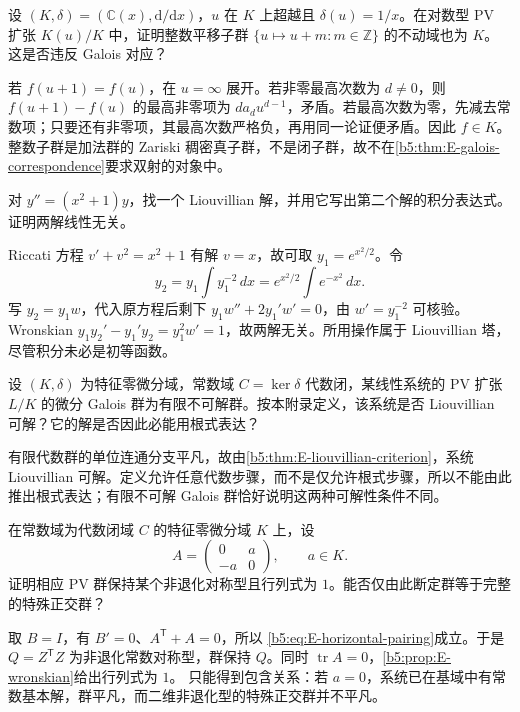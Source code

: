\begin{exercise}
	设 \((K,\delta)=(\mathbb C(x),\mathrm d/\mathrm dx)\)，\(u\) 在 \(K\) 上超越且 \(\delta(u)=1/x\)。在对数型 PV 扩张 \(K(u)/K\) 中，证明整数平移子群 \(\{u\mapsto u+m:m\in\mathbb Z\}\) 的不动域也为 \(K\)。这是否违反 Galois 对应？
\end{exercise}
\begin{solution}
	若 \(f(u+1)=f(u)\)，在 \(u=\infty\) 展开。若非零最高次数为 \(d\ne0\)，则 \(f(u+1)-f(u)\) 的最高非零项为 \(d a_du^{d-1}\)，矛盾。若最高次数为零，先减去常数项；只要还有非零项，其最高次数严格负，再用同一论证便矛盾。因此 \(f\in K\)。 整数子群是加法群的 Zariski 稠密真子群，不是闭子群，故不在\cref{b5:thm:E-galois-correspondence}要求双射的对象中。
\end{solution}

\begin{exercise}
	对 \(y''=(x^2+1)y\)，找一个 Liouvillian 解，并用它写出第二个解的积分表达式。证明两解线性无关。
\end{exercise}
\begin{solution}
	Riccati 方程 \(v'+v^2=x^2+1\) 有解 \(v=x\)，故可取 \(y_1=e^{x^2/2}\)。令
	\[
		y_2=y_1\int y_1^{-2}\,dx =e^{x^2/2}\int e^{-x^2}\,dx.
	\]
	写 \(y_2=y_1w\)，代入原方程后剩下 \(y_1w''+2y_1'w'=0\)，由 \(w'=y_1^{-2}\) 可核验。Wronskian \(y_1y_2'-y_1'y_2=y_1^2w'=1\)，故两解无关。所用操作属于 Liouvillian 塔，尽管积分未必是初等函数。
\end{solution}

\begin{exercise}
	设 \((K,\delta)\) 为特征零微分域，常数域 \(C=\ker\delta\) 代数闭，某线性系统的 PV 扩张 \(L/K\) 的微分 Galois 群为有限不可解群。按本附录定义，该系统是否 Liouvillian 可解？它的解是否因此必能用根式表达？
\end{exercise}
\begin{solution}
	有限代数群的单位连通分支平凡，故由\cref{b5:thm:E-liouvillian-criterion}，系统 Liouvillian 可解。定义允许任意代数步骤，而不是仅允许根式步骤，所以不能由此推出根式表达；有限不可解 Galois 群恰好说明这两种可解性条件不同。
\end{solution}

\begin{exercise}
	在常数域为代数闭域 \(C\) 的特征零微分域 \(K\) 上，设
	\[
		A=\begin{pmatrix}0&a\\-a&0\end{pmatrix},\qquad a\in K.
	\]
	证明相应 PV 群保持某个非退化对称型且行列式为 \(1\)。能否仅由此断定群等于完整的特殊正交群？
\end{exercise}
\begin{solution}
	取 \(B=I\)，有 \(B'=0\)、\(A^{\mathsf T}+A=0\)，所以 \eqref{b5:eq:E-horizontal-pairing}成立。于是 \(Q=Z^{\mathsf T}Z\) 为非退化常数对称型，群保持 \(Q\)。同时 \(\operatorname{tr}A=0\)，\cref{b5:prop:E-wronskian}给出行列式为 \(1\)。 只能得到包含关系：若 \(a=0\)，系统已在基域中有常数基本解，群平凡，而二维非退化型的特殊正交群并不平凡。
\end{solution}

